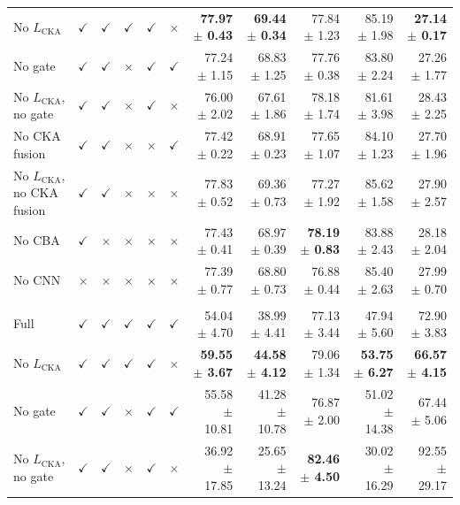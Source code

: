 \documentclass[10pt]{article}
\begin{document}
{\begin{longtable}{lccccc rrrrr}
No $L_{\mathrm{CKA}}$ & $\checkmark$ & $\checkmark$ & $\checkmark$ & $\checkmark$ & $\times$ & \textbf{77.97 $\pm$ 0.43} & \textbf{69.44 $\pm$ 0.34} & 77.84 $\pm$ 1.23 & 85.19 $\pm$ 1.98 & \textbf{27.14 $\pm$ 0.17} \\
No gate & $\checkmark$ & $\checkmark$ & $\times$ & $\checkmark$ & $\checkmark$ & 77.24 $\pm$ 1.15 & 68.83 $\pm$ 1.25 & 77.76 $\pm$ 0.38 & 83.80 $\pm$ 2.24 & 27.26 $\pm$ 1.77 \\
No $L_{\mathrm{CKA}}$, no gate & $\checkmark$ & $\checkmark$ & $\times$ & $\checkmark$ & $\times$ & 76.00 $\pm$ 2.02 & 67.61 $\pm$ 1.86 & 78.18 $\pm$ 1.74 & 81.61 $\pm$ 3.98 & 28.43 $\pm$ 2.25 \\
No CKA fusion & $\checkmark$ & $\checkmark$ & $\times$ & $\times$ & $\checkmark$ & 77.42 $\pm$ 0.22 & 68.91 $\pm$ 0.23 & 77.65 $\pm$ 1.07 & 84.10 $\pm$ 1.23 & 27.70 $\pm$ 1.96 \\
No $L_{\mathrm{CKA}}$, no CKA fusion & $\checkmark$ & $\checkmark$ & $\times$ & $\times$ & $\times$ & 77.83 $\pm$ 0.52 & 69.36 $\pm$ 0.73 & 77.27 $\pm$ 1.92 & 85.62 $\pm$ 1.58 & 27.90 $\pm$ 2.57 \\
No CBA & $\checkmark$ & $\times$ & $\times$ & $\times$ & $\times$ & 77.43 $\pm$ 0.41 & 68.97 $\pm$ 0.39 & \textbf{78.19 $\pm$ 0.83} & 83.88 $\pm$ 2.43 & 28.18 $\pm$ 2.04 \\
No CNN & $\times$ & $\times$ & $\times$ & $\times$ & $\times$ & 77.39 $\pm$ 0.77 & 68.80 $\pm$ 0.73 & 76.88 $\pm$ 0.44 & 85.40 $\pm$ 2.63 & 27.99 $\pm$ 0.70 \\
\addlinespace[4pt]
\multicolumn{11}{l}{\textit{Source: OVATUS $\rightarrow$ Target: USOVA}} \\
\midrule
Full & $\checkmark$ & $\checkmark$ & $\checkmark$ & $\checkmark$ & $\checkmark$ & 54.04 $\pm$ 4.70 & 38.99 $\pm$ 4.41 & 77.13 $\pm$ 3.44 & 47.94 $\pm$ 5.60 & 72.90 $\pm$ 3.83 \\
No $L_{\mathrm{CKA}}$ & $\checkmark$ & $\checkmark$ & $\checkmark$ & $\checkmark$ & $\times$ & \textbf{59.55 $\pm$ 3.67} & \textbf{44.58 $\pm$ 4.12} & 79.06 $\pm$ 1.34 & \textbf{53.75 $\pm$ 6.27} & \textbf{66.57 $\pm$ 4.15} \\
No gate & $\checkmark$ & $\checkmark$ & $\times$ & $\checkmark$ & $\checkmark$ & 55.58 $\pm$ 10.81 & 41.28 $\pm$ 10.78 & 76.87 $\pm$ 2.00 & 51.02 $\pm$ 14.38 & 67.44 $\pm$ 5.06 \\
No $L_{\mathrm{CKA}}$, no gate & $\checkmark$ & $\checkmark$ & $\times$ & $\checkmark$ & $\times$ & 36.92 $\pm$ 17.85 & 25.65 $\pm$ 13.24 & \textbf{82.46 $\pm$ 4.50} & 30.02 $\pm$ 16.29 & 92.55 $\pm$ 29.17 \\

\end{longtable}}
\end{document}
